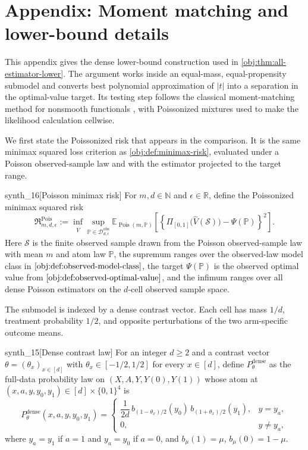\section{Appendix: Moment matching and lower-bound details}

This appendix gives the dense lower-bound construction used in \cref{obj:thm:all-estimator-lower}. The argument works inside an equal-mass, equal-propensity submodel and converts best polynomial approximation of \(|t|\) into a separation in the optimal-value target. Its testing step follows the classical moment-matching method for nonsmooth functionals \citep{CaiLow2011L1}, with Poissonized mixtures used to make the likelihood calculation cellwise.

We first state the Poissonized risk that appears in the comparison. It is the same minimax squared loss criterion as \cref{obj:def:minimax-risk}, evaluated under a Poisson observed-sample law and with the estimator projected to the target range.

\begin{definitionv}{synth_16}[Poisson minimax risk]
For \(m,d\in\mathbb N\) and \(\epsilon\in\mathbb R\), define the Poissonized minimax squared risk
\[
\mathfrak R^{\mathrm{Pois}}_{m,d,\epsilon}
:=
\inf_{\widehat V}
\sup_{\mathbb P\in\mathcal D_{d,\epsilon}^{\mathrm{obs}}}
\mathbb E_{\operatorname{Pois}(m,\mathbb P)}
\left[
\left\{
\Pi_{[0,1]}\bigl(\widehat V(\mathcal S)\bigr)
-\Psi(\mathbb P)
\right\}^{2}
\right].
\]
Here \(\mathcal S\) is the finite observed sample drawn from the Poisson observed-sample law with mean \(m\) and atom law \(\mathbb P\), the supremum ranges over the observed-law model class in \(\cref{obj:def:observed-model-class}\), the target \(\Psi(\mathbb P)\) is the observed optimal value from \(\cref{obj:def:observed-optimal-value}\), and the infimum ranges over all dense Poisson estimators on the \(d\)-cell observed sample space.
\end{definitionv}

The submodel is indexed by a dense contrast vector. Each cell has mass \(1/d\), treatment probability \(1/2\), and opposite perturbations of the two arm-specific outcome means.

\begin{definitionv}{synth_15}[Dense contrast law]
For an integer \(d\geq 2\) and a contrast vector \(\theta=(\theta_x)_{x\in[d]}\) with \(\theta_x\in[-1/2,1/2]\) for every \(x\in[d]\), define \(P_\theta^{\mathrm{dense}}\) as the full-data probability law on \((X,A,Y,Y(0),Y(1))\) whose atom at \((x,a,y,y_0,y_1)\in[d]\times\{0,1\}^4\) is
\[
P_\theta^{\mathrm{dense}}(x,a,y,y_0,y_1)
=
\begin{cases}
\dfrac{1}{2d}\, b_{(1-\theta_x)/2}(y_0)\, b_{(1+\theta_x)/2}(y_1),
& y=y_a,\\[0.8em]
0,
& y\neq y_a,
\end{cases}
\]
where \(y_a=y_1\) if \(a=1\) and \(y_a=y_0\) if \(a=0\), and \(b_\mu(1)=\mu\), \(b_\mu(0)=1-\mu\).
\end{definitionv}

